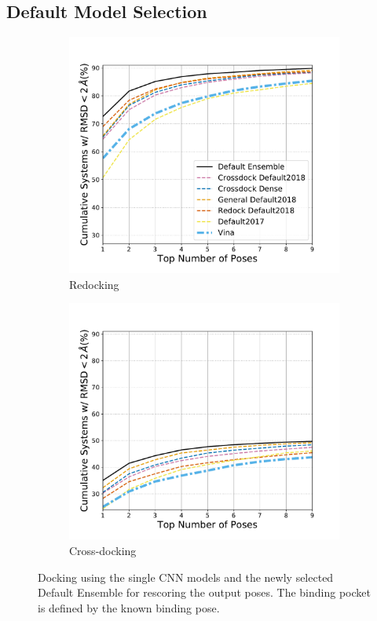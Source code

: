 \documentclass[journal=jcisd8,manuscript=article]{achemso}
\begin{document}
\subsection{Default Model Selection}
\begin{figure}
	\begin{subfigure}[b]{0.48\textwidth}
		\centering
		\includegraphics[width=\textwidth]{figures/redocking/rescore_single_models_line.pdf}
		\caption{Redocking}
		\label{fig:RescoreSingleRedock}
        \end{subfigure}    
	\begin{subfigure}[b]{0.48\textwidth}    
		\centering
		\includegraphics[width=\textwidth]{figures/crossdocking/rescore_single_models_line.pdf}
		\caption{Cross-docking}
		\label{fig:RescoreSingleCrossdock}
        \end{subfigure}    
	\caption{Docking using the single CNN models and the newly selected Default Ensemble for rescoring the output poses. The binding pocket is defined by the known binding pose.}
	\label{fig:RescoreSingle}
\end{figure}    
\end{document}
